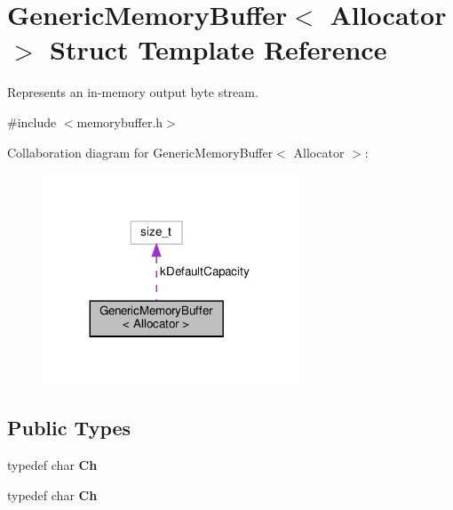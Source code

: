 \hypertarget{structGenericMemoryBuffer}{}\section{Generic\+Memory\+Buffer$<$ Allocator $>$ Struct Template Reference}
\label{structGenericMemoryBuffer}


Represents an in-\/memory output byte stream.  




{\ttfamily \#include $<$memorybuffer.\+h$>$}



Collaboration diagram for Generic\+Memory\+Buffer$<$ Allocator $>$\+:
\nopagebreak
\begin{figure}[H]
\begin{center}
\leavevmode
\includegraphics[width=215pt]{structGenericMemoryBuffer__coll__graph}
\end{center}
\end{figure}
\subsection*{Public Types}
\begin{DoxyCompactItemize}
\item 
\mbox{\label{structGenericMemoryBuffer_a212f137abfd8bce2ad216b2d960c027f}} 
typedef char {\bfseries Ch}
\item 
\mbox{\label{structGenericMemoryBuffer_a212f137abfd8bce2ad216b2d960c027f}} 
typedef char {\bfseries Ch}
\end{DoxyCompactItemize}
